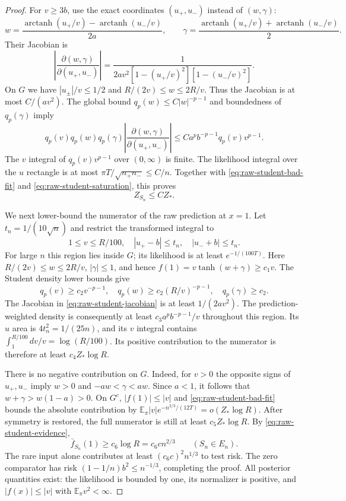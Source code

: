 \begin{proof}
For $v\ge3b$, use the exact coordinates $(u_+,u_-)$ instead of
$(w,\gamma)$:
\[
 w=\frac{\operatorname{arctanh}(u_+/v)
             -\operatorname{arctanh}(u_-/v)}{2a},\qquad
 \gamma=\frac{\operatorname{arctanh}(u_+/v)
             +\operatorname{arctanh}(u_-/v)}2.
\]
Their Jacobian is
\begin{equation}\label{eq:raw-student-jacobian}
 \left|\frac{\partial(w,\gamma)}{\partial(u_+,u_-)}\right|
 =\frac1{2av^2[1-(u_+/v)^2][1-(u_-/v)^2]}.
\end{equation}
On $G$ we have $|u_\pm|/v\le1/2$ and
$R/(2v)\le w\le2R/v$. Thus the Jacobian is at most $C/(av^2)$.
The global bound $q_p(w)\le C|w|^{-p-1}$ and boundedness of
$q_p(\gamma)$ imply
\[
 q_p(v)q_p(w)q_p(\gamma)
 \left|\frac{\partial(w,\gamma)}{\partial(u_+,u_-)}\right|
 \le C a^p b^{-p-1}q_p(v)v^{p-1}.
\]
The $v$ integral of $q_p(v)v^{p-1}$ over $(0,\infty)$ is finite.
The likelihood integral over the $u$ rectangle is at most
$\pi T/\sqrt{n_+n_-}\le C/n$.
Together with \eqref{eq:raw-student-bad-fit} and
\eqref{eq:raw-student-saturation}, this proves
\begin{equation}\label{eq:raw-student-evidence}
 Z_{S_n}\le C Z_*.
\end{equation}

We next lower-bound the numerator of the raw prediction at $x=1$.
Let $t_n=1/(10\sqrt n)$ and restrict the transformed integral to
\[
 1\le v\le R/100,\quad |u_+-b|\le t_n,\quad
 |u_-+b|\le t_n.
\]
For large $n$ this region lies inside $G$; its likelihood is at least
$e^{-1/(100T)}$. Here $R/(2v)\le w\le2R/v$, $|\gamma|\le1$,
and hence $f(1)=v\tanh(w+\gamma)\ge c_1v$.
The Student density lower bounds give
\[
 q_p(v)\ge c_2v^{-p-1},\quad
 q_p(w)\ge c_2(R/v)^{-p-1},\quad q_p(\gamma)\ge c_2.
\]
The Jacobian in \eqref{eq:raw-student-jacobian} is at least
$1/(2av^2)$. The prediction-weighted density is consequently at
least $c_3 a^p b^{-p-1}/v$ throughout this region. Its $u$ area is
$4t_n^2=1/(25n)$, and its $v$ integral contains
$\int_1^{R/100}dv/v=\log(R/100)$. Its positive contribution to the
numerator is therefore at least $c_4 Z_*\log R$.

There is no negative contribution on $G$. Indeed, for $v>0$ the
opposite signs of $u_+,u_-$ imply $w>0$ and $-aw<\gamma<aw$.
Since $a<1$, it follows that $w+\gamma>w(1-a)>0$.
On $G^c$, $|f(1)|\le|v|$ and
\eqref{eq:raw-student-bad-fit} bounds the absolute contribution by
$\mathbb E_\pi|v|e^{-n^{2/3}/(12T)}=o(Z_*\log R)$.
After symmetry is restored, the full numerator is still at least
$c_5Z_*\log R$. By \eqref{eq:raw-student-evidence},
\[
 \bar f_{S_n}(1)\ge c_6\log R=c_6c n^{2/3}
 \qquad(S_n\in E_n).
\]
The rare input alone contributes at least $(c_6c)^2n^{1/3}$ to test risk.
The zero comparator has risk $(1-1/n)b^2\le n^{-1/3}$, completing
the proof. All posterior quantities exist: the likelihood is bounded
by one, its normalizer is positive, and $|f(x)|\le|v|$ with
$\mathbb E_\pi v^2<\infty$.
\end{proof}

